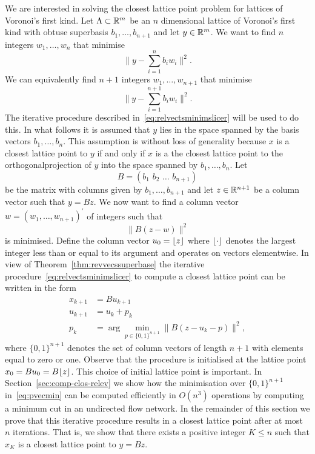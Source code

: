 \documentclass[final,leqno]{siamltex}
\begin{document}
We are interested in solving the closest lattice point problem for lattices of Voronoi's first kind.  Let $\Lambda \subset {\mathbb R}^m$ be an $n$ dimensional lattice of Voronoi's first kind with obtuse superbasis $b_1,\dots,b_{n+1}$ and let $y \in {\mathbb R}^m$.  We want to find $n$ integers $w_1,\dots,w_n$ that minimise
\[
\| y - \sum_{i=1}^n b_i w_i \|^2.
\]
We can equivalently find $n+1$ integers $w_1,\dots,w_{n+1}$ that minimise
\[
\| y - \sum_{i=1}^{n+1} b_i w_i \|^2.
\]
The iterative procedure described in~\eqref{eq:relvectsminimslicer} will be used to do this.  In what follows it is assumed that $y$ lies in the space spanned by the basis vectors $b_1,\dots,b_{n}$.  This assumption is without loss of generality because $x$ is a closest lattice point to $y$ if and only if $x$ is a the closest lattice point to the orthogonalprojection of $y$ into the space spanned by $b_1,\dots,b_{n}$.  Let
\begin{equation}\label{eq:matrxBobtusebasis}
B = (b_1\,\,b_2\,\,\dots\,\,b_{n+1})
\end{equation}
be the matrix with columns given by $b_1,\dots,b_{n+1}$ and let $z \in {\mathbb R}^{n+1}$ be a column vector such that $y = Bz$.  We now want to find a column vector $w = (w_1,\dots,w_{n+1})^\prime$ of integers such that
\begin{equation}\label{eq:tominimise}
\| B(z  -  w) \|^2
\end{equation}
is minimised.  Define the column vector $u_0 = {\left\lfloor z \right\rfloor}$ where ${\left\lfloor \cdot \right\rfloor}$ denotes the largest integer less than or equal to its argument and operates on vectors elementwise. In view of Theorem~\ref{thm:revvecssuperbase} the iterative procedure~\eqref{eq:relvectsminimslicer} to compute a closest lattice point can be written in the form
\begin{align}
x_{k+1} &= B u_{k+1} \label{eq:xseqfirsttype}  \\
u_{k+1} &= u_k + p_k \nonumber \\
p_k &= \arg\min_{p \in \{0,1\}^{n+1}}\| B(z - u_k - p) \|^2, \label{eq:pvecmin}
\end{align}
where $\{0,1\}^{n+1}$ denotes the set of column vectors of length $n+1$ with elements equal to zero or one.  Observe that the procedure is initialised at the lattice point $x_0 = Bu_0 = B{\left\lfloor z \right\rfloor}$.  This choice of initial lattice point is important.  In Section~\ref{sec:comp-clos-relev} we show how the minimisation over $\{0,1\}^{n+1}$ in~\eqref{eq:pvecmin} can be computed efficiently in $O(n^3)$ operations by computing a minimum cut in an undirected flow network.  In the remainder of this section we prove that this iterative procedure results in a closest lattice point after at most $n$ iterations.  That is, we show that there exists a positive integer $K \leq n$ such that $x_K$ is a closest lattice point to $y = Bz$.
\end{document}
